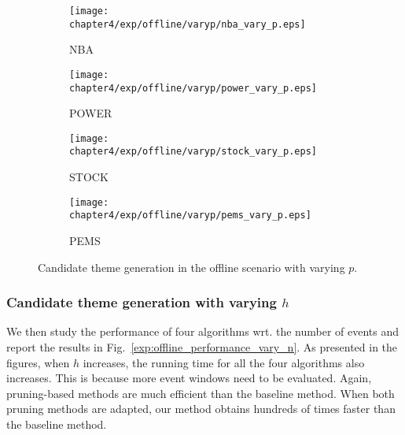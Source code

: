 \begin{figure*}[t]
\centering
    \begin{subfigure}[b]{0.45\textwidth}
        \texttt{[image: chapter4/exp/offline/varyp/nba\_vary\_p.eps]}
        \caption{NBA}
    \end{subfigure}
    \begin{subfigure}[b]{0.45\textwidth}
        \texttt{[image: chapter4/exp/offline/varyp/power\_vary\_p.eps]}
        \caption{POWER}
    \end{subfigure}
    \begin{subfigure}[b]{0.45\textwidth}
        \texttt{[image: chapter4/exp/offline/varyp/stock\_vary\_p.eps]}
        \caption{STOCK}
    \end{subfigure}
    \begin{subfigure}[b]{0.45\textwidth}
        \texttt{[image: chapter4/exp/offline/varyp/pems\_vary\_p.eps]}
        \caption{PEMS}
    \end{subfigure}
\caption{Candidate theme generation in the offline scenario with varying $p$.}
\label{exp:offline_performance_vary_p}
\end{figure*}

\subsubsection{Candidate theme generation with varying $h$}
We then study the performance of four algorithms wrt. the number of events and report the results 
in Fig.~\ref{exp:offline_performance_vary_n}. As presented in the figures, when $h$ increases, 
the running time for all the four algorithms also increases. This is because more event windows need to be evaluated. 
Again, pruning-based methods are much efficient than the baseline method. When both pruning methods are adapted, our method obtains hundreds of times faster than the baseline method.


